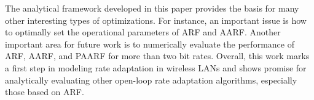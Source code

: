 \documentclass[11pt, journal, letterpaper, oneside, onecolumn]{IEEEtran}
\begin{document}
The analytical framework developed in this paper provides the
basis for many other interesting types of optimizations. For
instance, an important issue is how to optimally set the
operational parameters of ARF and AARF.  Another important area
for future work is to numerically evaluate the performance of ARF,
AARF, and PAARF for more than two bit rates. Overall, this work marks a first step in modeling rate adaptation in wireless LANs and shows promise for analytically evaluating other open-loop rate adaptation algorithms, especially
those based on ARF.




\newpage
\end{document}
